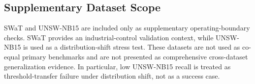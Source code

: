 \subsection{Supplementary Dataset Scope}

SWaT and UNSW-NB15 are included only as supplementary operating-boundary checks. SWaT provides an industrial-control validation context, while UNSW-NB15 is used as a distribution-shift stress test. These datasets are not used as co-equal primary benchmarks and are not presented as comprehensive cross-dataset generalization evidence. In particular, low UNSW-NB15 recall is treated as threshold-transfer failure under distribution shift, not as a success case.
